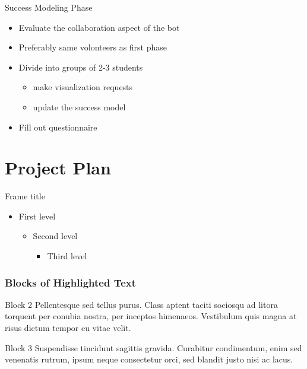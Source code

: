 \begin{frame}{Success Modeling Phase}
  \begin{itemize}
    \item Evaluate the collaboration aspect of the bot
    \item Preferably same volonteers as first phase %
    \item Divide into groups of 2-3 students
          \begin{itemize}
            \item make visualization requests
            \item update the success model
          \end{itemize}
    \item Fill out questionnaire
  \end{itemize}
\end{frame}

\section{Project Plan}
\begin{frame}{Frame title}
  \begin{itemize}
    \item First level
          \begin{itemize}
            \item Second level
                  \begin{itemize}
                    \item Third level
                  \end{itemize}
          \end{itemize}
  \end{itemize}
\end{frame}


\begin{frame}
  \frametitle{Blocks of Highlighted Text}


  \begin{block}{Block 2}
    Pellentesque sed tellus purus. Class aptent taciti sociosqu ad litora torquent per conubia nostra, per inceptos himenaeos. Vestibulum quis magna at risus dictum tempor eu vitae velit.
  \end{block}

  \begin{block}{Block 3}
    Suspendisse tincidunt sagittis gravida. Curabitur condimentum, enim sed venenatis rutrum, ipsum neque consectetur orci, sed blandit justo nisi ac lacus.
  \end{block}
\end{frame}

